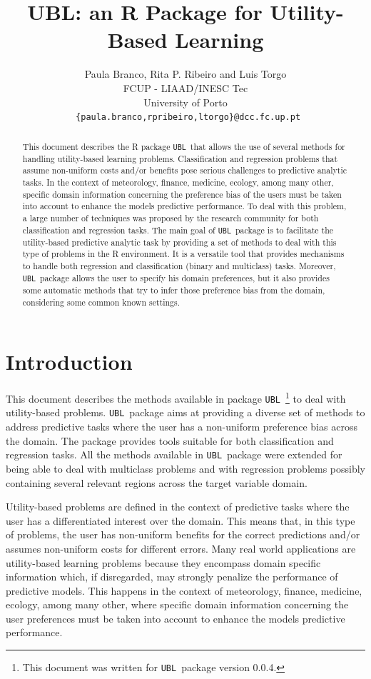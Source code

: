 \documentclass[10pt,a4paper]{article}\usepackage[]{graphicx}\usepackage[]{color}
\author{Paula Branco, Rita P. Ribeiro and Luis Torgo\\FCUP - LIAAD/INESC Tec\\University of Porto\\
  \texttt{ \{paula.branco,rpribeiro,ltorgo\}@dcc.fc.up.pt}}
\title{UBL: an R Package for Utility-Based Learning}
\newcommand{\pUBL}{package \texttt{UBL}\ }
\newcommand{\UBLp}{\texttt{UBL}\ package  }
\newcommand{\version}{0.0.4}
\begin{document}
\maketitle


\begin{abstract}
  
  This document describes the R \pUBL that allows the use of several methods for handling utility-based learning problems. Classification and regression problems that assume non-uniform costs and/or benefits pose serious challenges to predictive analytic tasks. In the context of meteorology, finance, medicine, ecology, among many other, specific domain information concerning the preference bias of the users must be taken into account to enhance the models predictive performance. To deal with this problem, a large number of techniques was proposed by the research community for both classification and regression tasks. 
  The main goal of \UBLp is to facilitate the utility-based predictive analytic task by providing a set of methods to deal with this type of problems in the R environment. It is a versatile tool that provides mechanisms to handle both regression and classification (binary and multiclass) tasks. Moreover, \UBLp allows the user to specify his domain preferences, but it also provides some automatic methods that try to infer those preference bias from the domain, considering some common known settings. 

\end{abstract}

\section{Introduction}

This document describes the methods available in \pUBL \footnote{This document was written for \UBLp version \version.} to deal with utility-based problems. \UBLp aims at providing a diverse set of methods to address predictive tasks where the user has a non-uniform preference bias across the domain. The package provides tools suitable for both classification and regression tasks. All the methods available in \UBLp were extended for being able to deal with multiclass problems and with regression problems possibly containing several relevant regions across the target variable domain. 


Utility-based problems are defined in the context of predictive tasks where the user has a differentiated interest over the domain. This means that, in this type of problems, the user has non-uniform benefits for the correct predictions and/or assumes non-uniform costs for different errors. Many real world applications are utility-based learning problems because they encompass domain specific information which, if disregarded, may strongly penalize the performance of predictive models. This happens in the context of meteorology, finance, medicine, ecology, among many other, where specific domain information concerning the user preferences must be taken into account to enhance the models predictive performance.
\end{document}
